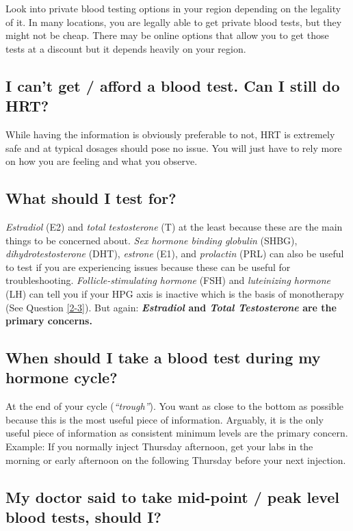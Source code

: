 \documentclass{article}
\begin{document}
Look into private blood testing options in your region depending on the legality of it. In many locations, you are legally able to get private blood tests, but they might not be cheap. There may be online options that allow you to get those tests at a discount but it depends heavily on your region.

\subsection{I can’t get / afford a blood test. Can I still do HRT?}

While having the information is obviously preferable to not, HRT is extremely safe and at typical dosages should pose no issue. You will just have to rely more on how you are feeling and what you observe.

\subsection{What should I test for?}

\textit{Estradiol} (E2) and \textit{total testosterone} (T) at the least because these are the main things to be concerned about. \textit{Sex hormone binding globulin} (SHBG), \textit{dihydrotestosterone} (DHT), \textit{estrone} (E1), and \textit{prolactin }(PRL) can also be useful to test if you are experiencing issues because these can be useful for troubleshooting. \textit{Follicle-stimulating hormone} (FSH) and \textit{luteinizing hormone} (LH) can tell you if your HPG axis is inactive which is the basis of monotherapy (See Question \ref{2-3}). But again: \textbf{\textit{Estradiol} and \textit{Total Testosterone} are the primary concerns. }

\subsection{When should I take a blood test during my hormone cycle?}

At the end of your cycle (\textit{“trough”}). You want as close to the bottom as possible because this is the most useful piece of information. Arguably, it is the only useful piece of information as consistent minimum levels are the primary concern. Example: If you normally inject Thursday afternoon, get your labs in the morning or early afternoon on the following Thursday before your next injection.

\subsection{My doctor said to take mid-point / peak level blood tests, should I?}
\end{document}
